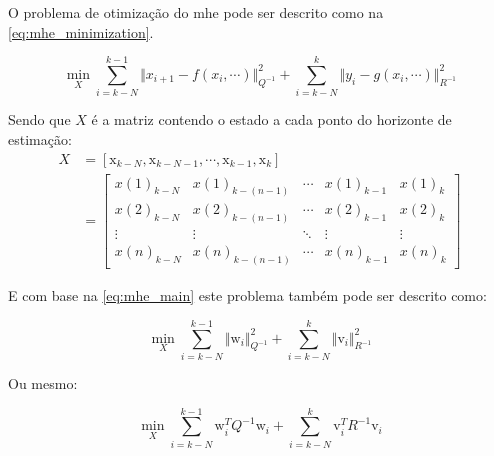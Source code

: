 O problema de otimização do \acrshort{mhe} pode ser descrito como na \cref{eq:mhe_minimization}.

\begin{equation}
	\label{eq:mhe_minimization}
	\min_{X} \sum_{i=k-N}^{k-1} \Vert x_{i+1} - f(x_i, \cdots) \Vert^2_{Q^{-1}} + 
			\sum_{i=k-N}^{k} \Vert y_i - g(x_i, \cdots) \Vert^2_{R^{-1}}
\end{equation}

Sendo que $X$ é a matriz contendo o estado a cada ponto do horizonte de estimação:
\begin{equation}
	\begin{aligned}
		X &= [\mathrm{x}_{k-N}, \mathrm{x}_{k-N-1}, \cdots, \mathrm{x}_{k-1}, \mathrm{x}_k] \\
		&=
		\begin{bmatrix}
			x(1)_{k-N} & x(1)_{k-(n-1)} & \cdots & x(1)_{k-1} & x(1)_k		\\
			x(2)_{k-N} & x(2)_{k-(n-1)} & \cdots & x(2)_{k-1} & x(2)_k		\\
			\vdots & \vdots & \ddots & \vdots & \vdots						\\
			x(n)_{k-N} & x(n)_{k-(n-1)} & \cdots & x(n)_{k-1} & x(n)_k	
		\end{bmatrix}
	\end{aligned}
\end{equation}

E com base na \cref{eq:mhe_main} este problema também pode ser descrito como:

\begin{equation}
	\label{eq:mhe_minimization2}
	\min_{X} \sum_{i=k-N}^{k-1} \Vert \mathrm{w}_i \Vert^2_{Q^{-1}} + 
			\sum_{i=k-N}^{k} \Vert \mathrm{v}_i \Vert^2_{R^{-1}}
\end{equation}

Ou mesmo:

\begin{equation}
	\label{eq:mhe_minimization3}
	\min_{X} \sum_{i=k-N}^{k-1} \mathrm{w}^T_i Q^{-1} \mathrm{w}_i + 
			\sum_{i=k-N}^{k} \mathrm{v}^T_i R^{-1} \mathrm{v}_i
\end{equation}

